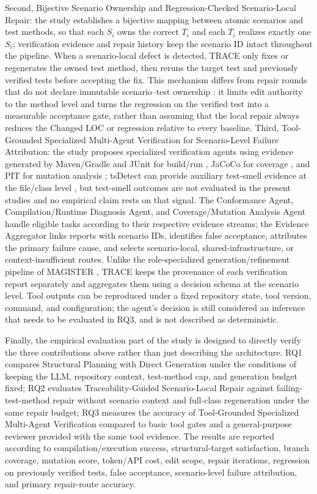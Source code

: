 \documentclass[pdflatex,sn-basic,Numbered,iicol]{sn-jnl}
\begin{document}
Second, Bijective Scenario Ownership and Regression-Checked Scenario-Local Repair: the study establishes a bijective mapping between atomic scenarios and test methods, so that each $S_i$ owns the correct $T_i$ and each $T_i$ realizes exactly one $S_i$; verification evidence and repair history keep the scenario ID intact throughout the pipeline. When a scenario-local defect is detected, TRACE only fixes or regenerates the owned test method, then reruns the target test and previously verified tests before accepting the fix. This mechanism differs from repair rounds that do not declare immutable scenario--test ownership \cite{bib26,bib4,bib27,bib28}: it limits edit authority to the method level and turns the regression on the verified test into a measurable acceptance gate, rather than assuming that the local repair always reduces the Changed LOC or regression relative to every baseline. Third, Tool-Grounded Specialized Multi-Agent Verification for Scenario-Level Failure Attribution: the study proposes specialized verification agents using evidence generated by Maven/Gradle and JUnit for build/run \cite{bib35}, JaCoCo for coverage \cite{bib33}, and PIT for mutation analysis \cite{bib34}; tsDetect can provide auxiliary test-smell evidence at the file/class level \cite{bib25}, but test-smell outcomes are not evaluated in the present studies and no empirical claim rests on that signal. The Conformance Agent, Compilation/Runtime Diagnosis Agent, and Coverage/Mutation Analysis Agent handle eligible tasks according to their respective evidence streams; the Evidence Aggregator links reports with scenario IDs, identifies false acceptance, attributes the primary failure cause, and selects scenario-local, shared-infrastructure, or context-insufficient routes. Unlike the role-specialized generation/refinement pipeline of MAGISTER \cite{bib31}, TRACE keeps the provenance of each verification report separately and aggregates them using a decision schema at the scenario level. Tool outputs can be reproduced under a fixed repository state, tool version, command, and configuration; the agent's decision is still considered an inference that needs to be evaluated in RQ3, and is not described as deterministic.

Finally, the empirical evaluation part of the study is designed to directly verify the three contributions above rather than just describing the architecture. RQ1 compares Structural Planning with Direct Generation under the conditions of keeping the LLM, repository context, test-method cap, and generation budget fixed; RQ2 evaluates Traceability-Guided Scenario-Local Repair against failing-test-method repair without scenario context and full-class regeneration under the same repair budget; RQ3 measures the accuracy of Tool-Grounded Specialized Multi-Agent Verification compared to basic tool gates and a general-purpose reviewer provided with the same tool evidence. The results are reported according to compilation/execution success, structural-target satisfaction, branch coverage, mutation score, token/API cost, edit scope, repair iterations, regression on previously verified tests, false acceptance, scenario-level failure attribution, and primary repair-route accuracy.
\end{document}
